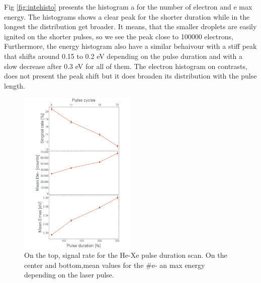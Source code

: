 Fig \ref{fig:intehisto} presents the histogram a for the number of electron and e max energy. The histograms shows a clear peak for the shorter duration while in the longest the distribution get broader. It means, that the smaller droplets are easily ignited on the shorter pulses, so we see the peak close to 100000 electrons, Furthermore, the energy histogram also  have a similar behaivour with a stiff peak that shifts around 0.15 to 0.2 eV depending on the pulse duration and with a slow decrease after 0.3 eV for all of them. The electron histogram on contrasts, does not present the peak shift but it does broaden its distribution with the pulse length.


\begin{figure}[hbtp]
\centering
\includegraphics[width=0.5\textwidth]{../Images/results/MIR_He_pulsescan/raw/Alltogether.png}
\caption[MIR He pulse scan. Signal rate and mean values]{On the top, signal rate for the He-Xe  pulse duration scan. On the center and bottom,mean values for the $\#$e- an max energy depending on the laser pulse.}
\label{fig:Hepulseall}
\end{figure}

